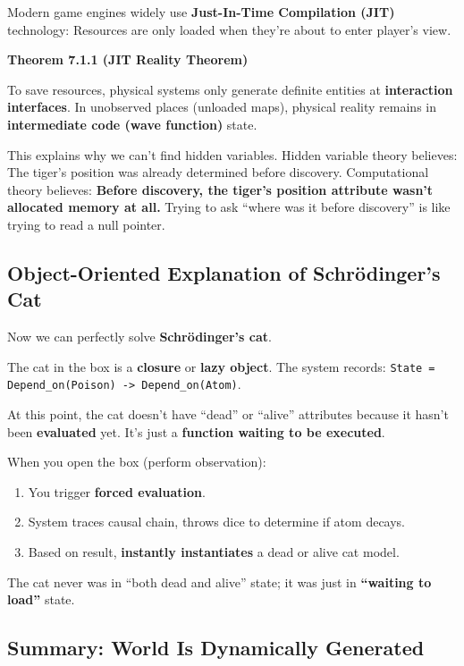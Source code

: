 Modern game engines widely use \textbf{Just-In-Time Compilation (JIT)} technology: Resources are only loaded when they're about to enter player's view.

\textbf{Theorem 7.1.1 (JIT Reality Theorem)}

To save resources, physical systems only generate definite entities at \textbf{interaction interfaces}. In unobserved places (unloaded maps), physical reality remains in \textbf{intermediate code (wave function)} state.

This explains why we can't find hidden variables.
Hidden variable theory believes: The tiger's position was already determined before discovery.
Computational theory believes: \textbf{Before discovery, the tiger's position attribute wasn't allocated memory at all.} Trying to ask ``where was it before discovery'' is like trying to read a null pointer.

\subsection{Object-Oriented Explanation of Schrödinger's Cat}

Now we can perfectly solve \textbf{Schrödinger's cat}.

The cat in the box is a \textbf{closure} or \textbf{lazy object}.
The system records: \texttt{State = Depend\_on(Poison) -> Depend\_on(Atom)}.

At this point, the cat doesn't have ``dead'' or ``alive'' attributes because it hasn't been \textbf{evaluated} yet. It's just a \textbf{function waiting to be executed}.

When you open the box (perform observation):
\begin{enumerate}
\item You trigger \textbf{forced evaluation}.
\item System traces causal chain, throws dice to determine if atom decays.
\item Based on result, \textbf{instantly instantiates} a dead or alive cat model.
\end{enumerate}

The cat never was in ``both dead and alive'' state; it was just in \textbf{``waiting to load''} state.

\subsection{Summary: World Is Dynamically Generated}

